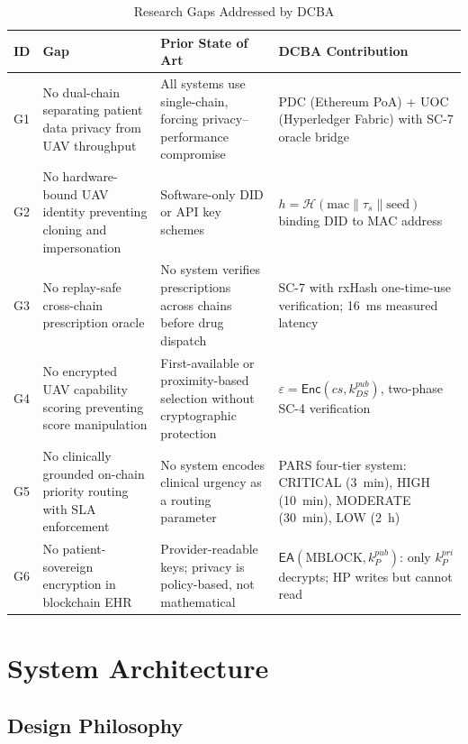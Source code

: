 \documentclass[sigplan,screen,review=false]{acmart}
\begin{document}
\begin{table}[ht]
\centering
\caption{Research Gaps Addressed by DCBA}
\label{tab:gaps}
\begin{tabular}{@{}p{0.5cm}p{3.5cm}p{4.5cm}p{5cm}@{}}
\toprule
\textbf{ID} & \textbf{Gap} & \textbf{Prior State of Art} & \textbf{DCBA Contribution} \\
\midrule
G1 & No dual-chain separating patient data privacy from UAV throughput
   & All systems use single-chain, forcing privacy--performance compromise
   & PDC (Ethereum PoA) + UOC (Hyperledger Fabric) with SC-7 oracle bridge \\
\addlinespace
G2 & No hardware-bound UAV identity preventing cloning and impersonation
   & Software-only DID or API key schemes
   & $h = \mathcal{H}(\text{mac} \| \tau_s \| \text{seed})$ binding DID to MAC address \\
\addlinespace
G3 & No replay-safe cross-chain prescription oracle
   & No system verifies prescriptions across chains before drug dispatch
   & SC-7 with rxHash one-time-use verification; 16~ms measured latency \\
\addlinespace
G4 & No encrypted UAV capability scoring preventing score manipulation
   & First-available or proximity-based selection without cryptographic protection
   & $\varepsilon = \mathsf{Enc}(cs, k^{pub}_{DS})$, two-phase SC-4 verification \\
\addlinespace
G5 & No clinically grounded on-chain priority routing with SLA enforcement
   & No system encodes clinical urgency as a routing parameter
   & PARS four-tier system: CRITICAL (3~min), HIGH (10~min), MODERATE (30~min), LOW (2~h) \\
\addlinespace
G6 & No patient-sovereign encryption in blockchain EHR
   & Provider-readable keys; privacy is policy-based, not mathematical
   & $\mathsf{EA}(\text{MBLOCK}, k^{pub}_P)$: only $k^{pri}_P$ decrypts; HP writes but cannot read \\
\bottomrule
\end{tabular}
\end{table}

\section{System Architecture}
\label{sec:architecture}

\subsection{Design Philosophy}
\end{document}
